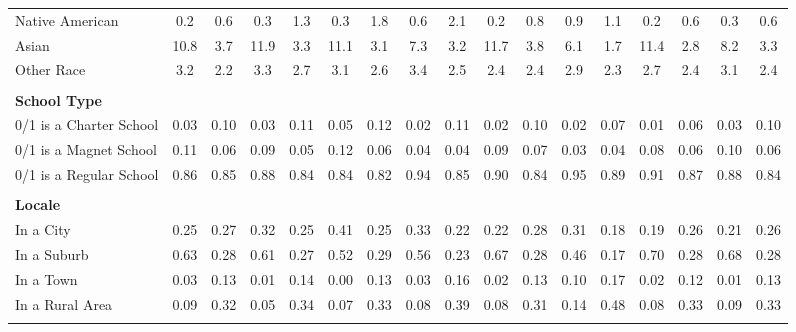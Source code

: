 \begin{tabular*}{\linewidth}{@{\extracolsep{\fill} } lcccccccccccccccc}
\hspace{0.2cm}Native American&0.2&0.6&0.3&1.3&0.3&1.8&0.6&2.1&0.2&0.8&0.9&1.1&0.2&0.6&0.3&0.6\\%
\hspace{0.2cm}Asian&10.8&3.7&11.9&3.3&11.1&3.1&7.3&3.2&11.7&3.8&6.1&1.7&11.4&2.8&8.2&3.3\\%
\hspace{0.2cm}Other Race&3.2&2.2&3.3&2.7&3.1&2.6&3.4&2.5&2.4&2.4&2.9&2.3&2.7&2.4&3.1&2.4\\%
&&&&&&&&&&&&&&&&\\%
\multicolumn{17}{l}{\bfseries School Type}\\%
\hspace{0.2cm}0/1 is a Charter School&0.03&0.10&0.03&0.11&0.05&0.12&0.02&0.11&0.02&0.10&0.02&0.07&0.01&0.06&0.03&0.10\\%
\hspace{0.2cm}0/1 is a Magnet School&0.11&0.06&0.09&0.05&0.12&0.06&0.04&0.04&0.09&0.07&0.03&0.04&0.08&0.06&0.10&0.06\\%
\hspace{0.2cm}0/1 is a Regular School&0.86&0.85&0.88&0.84&0.84&0.82&0.94&0.85&0.90&0.84&0.95&0.89&0.91&0.87&0.88&0.84\\%
&&&&&&&&&&&&&&&&\\%
\multicolumn{17}{l}{\bfseries Locale}\\%
\hspace{0.2cm}In a City&0.25&0.27&0.32&0.25&0.41&0.25&0.33&0.22&0.22&0.28&0.31&0.18&0.19&0.26&0.21&0.26\\%
\hspace{0.2cm}In a Suburb&0.63&0.28&0.61&0.27&0.52&0.29&0.56&0.23&0.67&0.28&0.46&0.17&0.70&0.28&0.68&0.28\\%
\hspace{0.2cm}In a Town&0.03&0.13&0.01&0.14&0.00&0.13&0.03&0.16&0.02&0.13&0.10&0.17&0.02&0.12&0.01&0.13\\%
\hspace{0.2cm}In a Rural Area&0.09&0.32&0.05&0.34&0.07&0.33&0.08&0.39&0.08&0.31&0.14&0.48&0.08&0.33&0.09&0.33\\%
&&&&&&&&&&&&&&&&\\%
\hline%
\end{tabular*}